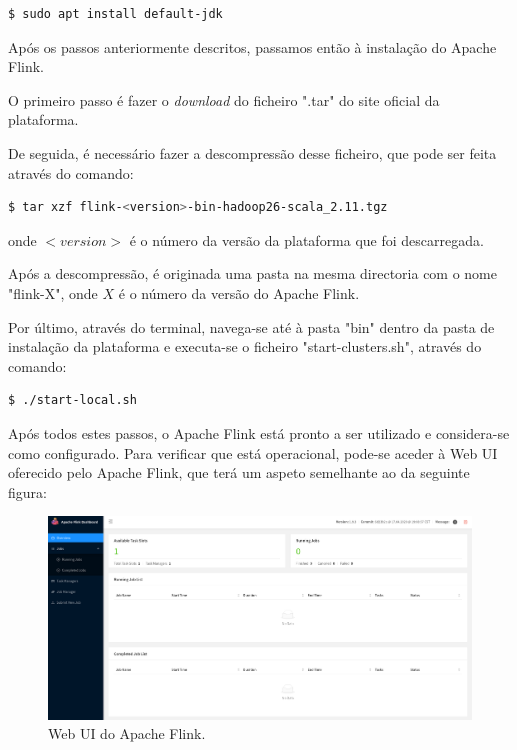 \documentclass[conference]{IEEEtran}
\begin{document}
\begin{lstlisting}[language=bash]
  $ sudo apt install default-jdk
\end{lstlisting}

Após os passos anteriormente descritos, passamos então à instalação do Apache Flink.

O primeiro passo é fazer o \emph{download} do ficheiro ".tar" do site oficial da plataforma.

De seguida, é necessário fazer a descompressão desse ficheiro, que pode ser feita através do comando:

\begin{lstlisting}[language=bash]
  $ tar xzf flink-<version>-bin-hadoop26-scala_2.11.tgz
\end{lstlisting}

onde $<version>$ é o número da versão da plataforma que foi descarregada.

Após a descompressão, é originada uma pasta na mesma directoria com o nome "flink-X", onde $X$ é o número da versão do Apache Flink.

Por último, através do terminal, navega-se até à pasta "bin" dentro da pasta de instalação da plataforma e executa-se o ficheiro "start-clusters.sh", através do comando:

\begin{lstlisting}[language=bash]
  $ ./start-local.sh
\end{lstlisting}

Após todos estes passos, o Apache Flink está pronto a ser utilizado e considera-se como configurado. Para verificar que está operacional, pode-se aceder à Web UI oferecido pelo Apache Flink, que terá um aspeto semelhante ao da seguinte figura:

\begin{figure}[!htbp]
\centering
\includegraphics[scale=0.130]{webui.png}
\caption{Web UI do Apache Flink.}
\label{WebUi}
\end{figure}
\end{document}
